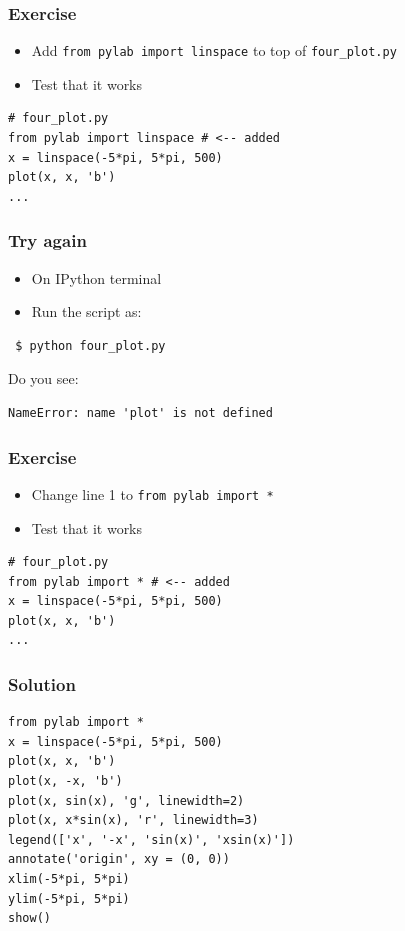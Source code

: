 \documentclass[14pt,compress]{beamer}
\newcounter{time}
\newcommand{\inctime}[1]{\addtocounter{time}{#1}{\tiny \thetime\ m}}
\newcommand{\typ}[1]{\lstinline{#1}}
\begin{document}
\begin{frame}[fragile]
  \frametitle{Exercise}
  \begin{itemize}
  \item Add \typ{from pylab import linspace} to top of \typ{four_plot.py}
  \item Test that it works
  \end{itemize}
\begin{lstlisting}
# four_plot.py
from pylab import linspace # <-- added
x = linspace(-5*pi, 5*pi, 500)
plot(x, x, 'b')
...
\end{lstlisting}
\end{frame}

\begin{frame}[fragile]
  \frametitle{Try again}
  \begin{itemize}
  \item On IPython terminal
  \item Run the script as:
  \end{itemize}
\begin{lstlisting}
 $ python four_plot.py
\end{lstlisting}
  \pause
  \vspace*{0.15in}
  Do you see:
  \begin{small}
\begin{lstlisting}
NameError: name 'plot' is not defined
\end{lstlisting}
  \end{small}
\end{frame}

\begin{frame}[fragile]
  \frametitle{Exercise}
  \begin{itemize}
  \item Change line 1 to \typ{from pylab import *}
  \item Test that it works
  \end{itemize}
\begin{lstlisting}
# four_plot.py
from pylab import * # <-- added
x = linspace(-5*pi, 5*pi, 500)
plot(x, x, 'b')
...
\end{lstlisting}
\inctime{5}
\end{frame}

\begin{frame}[fragile]
  \frametitle{Solution}
  \small
\begin{lstlisting}
from pylab import *
x = linspace(-5*pi, 5*pi, 500)
plot(x, x, 'b')
plot(x, -x, 'b')
plot(x, sin(x), 'g', linewidth=2)
plot(x, x*sin(x), 'r', linewidth=3)
legend(['x', '-x', 'sin(x)', 'xsin(x)'])
annotate('origin', xy = (0, 0))
xlim(-5*pi, 5*pi)
ylim(-5*pi, 5*pi)
show()
\end{lstlisting}
\end{frame}
\end{document}
